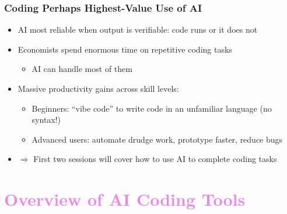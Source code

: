 \documentclass[aspectratio=169, 12pt]{beamer}
\begin{document}
\begin{frame}
\frametitle{Coding Perhaps Highest-Value Use of AI}

\begin{itemize}
    \item AI most reliable when output is verifiable: code runs or it does not
    \item Economists spend enormous time on repetitive coding tasks
     \begin{itemize}
            \item[$\circ$] AI can handle most of them
        \end{itemize}
    \item Massive productivity gains across skill levels:
        \begin{itemize}
            \item[$\circ$] Beginners: ``vibe code'' to write code in an unfamiliar language (no syntax!)
            \item[$\circ$] Advanced users: automate drudge work, prototype faster, reduce bugs
        \end{itemize}
     \vspace{.05in}
     \pause
    \item[] $\Rightarrow$ First two sessions will cover how to use AI to complete coding tasks
\end{itemize}

\end{frame}


\section{\textcolor{violet}{Overview of AI Coding Tools \vspace{0.3in}}}
\end{document}
